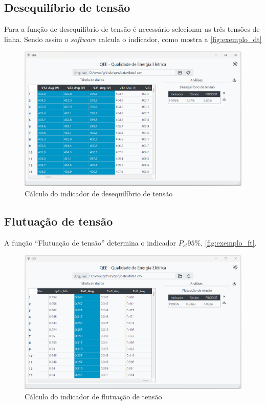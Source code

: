 \subsection{Desequilíbrio de tensão}

Para a função de desequilíbrio de tensão é necessário selecionar as três tensões de linha. Sendo assim o \textit{software} calcula o indicador, como mostra a \autoref{fig:exemplo_dt}

\begin{figure}[H]
  \centering
  \caption{Cálculo do indicador de desequilíbrio de tensão}
  \label{fig:exemplo_dt}
  \includegraphics[width=15cm]{illustrations/figures/exemplo_dt.png}
\end{figure}

\subsection{Flutuação de tensão}

A função ``Flutuação de tensão'' determina o indicador $P_{st}95\%$, \autoref{fig:exemplo_ft}.

\begin{figure}[H]
  \centering
  \caption{Cálculo do indicador de flutuação de tensão}
  \label{fig:exemplo_ft}
  \includegraphics[width=15cm]{illustrations/figures/exemplo_ft.png}
\end{figure}

